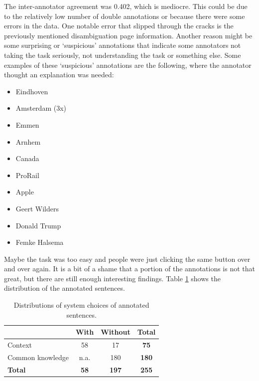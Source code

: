\documentclass[
10pt, %
a4paper, %
oneside, %
headinclude,footinclude, %
] {book}%
\begin{document}
The inter-annotator agreement was 0.402, which is mediocre.
This could be due to the relatively low number of double annotations or because there were some errors in the data.
One notable error that slipped through the cracks is the previously mentioned disambiguation page information.
Another reason might be some surprising or `suspicious' annotations that indicate some annotators not taking the task seriously, not understanding the task or something else.
Some examples of these `suspicious' annotations are the following, where the annotator thought an explanation was needed:

\begin{multicols}{2}
  \begin{itemize}
    \item Eindhoven
    \item Amsterdam (3x)
    \item Emmen
    \item Arnhem
    \item Canada
    \item ProRail
    \item Apple
    \item Geert Wilders
    \item Donald Trump
    \item Femke Halsema
  \end{itemize}
\end{multicols}

Maybe the task was too easy and people were just clicking the same button over and over again.
It is a bit of a shame that a portion of the annotations is not that great, but there are still enough interesting findings.
Table \ref{table:annotations} shows the distribution of the annotated sentences.

\begin{table}[hbtp]\centering
  \caption{Distributions of system choices of annotated sentences.\label{table:annotations}}
  \begin{tabular}{l|ccc}
                     & With        & Without      & \textbf{Total} \\
    \hline
    Context          & 58          & 17           & \textbf{75}    \\
    Common knowledge & n.a.        & 180          & \textbf{180}   \\
    \textbf{Total}   & \textbf{58} & \textbf{197} & \textbf{255}   \\
  \end{tabular}
\end{table}
\end{document}
